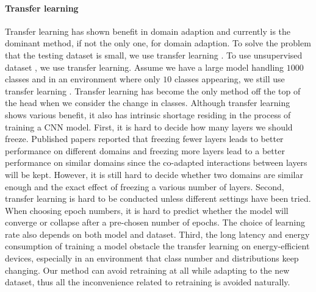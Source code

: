 \documentclass[pageno]{jpaper}
\begin{document}
\paragraph{Transfer learning}
Transfer learning has shown benefit in domain adaption and currently is the dominant method, if not the only one, for domain adaption. To solve the problem that the testing dataset is small, we use transfer learning \cite{oquab2014learning}. To use unsupervised dataset \cite{doersch2015unsupervised, noroozi2016unsupervised}, we use transfer learning. Assume we have a large model handling $1000$ classes and in an environment where only $10$ classes appearing, we still use transfer learning \cite{han2016mcdnn, shen2016fast}. Transfer learning has become the only method off the top of the head when we consider the change in classes. Although transfer learning shows various benefit, it also has intrinsic shortage residing in the process of training a CNN model. First, it is hard to decide how many layers we should freeze. Published papers \cite{yosinski2014transferable} reported that freezing fewer layers leads to better performance on different domains and freezing more layers lead to a better performance on similar domains since the co-adapted interactions between layers will be kept. However, it is still hard to decide whether two domains are similar enough and the exact effect of freezing a various number of layers. Second, transfer learning is hard to be conducted unless different settings have been tried. When choosing epoch numbers, it is hard to predict whether the model will converge or collapse after a pre-chosen number of epochs. The choice of learning rate also depends on both model and dataset. Third, the long latency and energy consumption of training a model obstacle the transfer learning on energy-efficient devices, especially in an environment that class number and distributions keep changing. Our method can avoid retraining at all while adapting to the new dataset, thus all the inconvenience related to retraining is avoided naturally.
\end{document}
